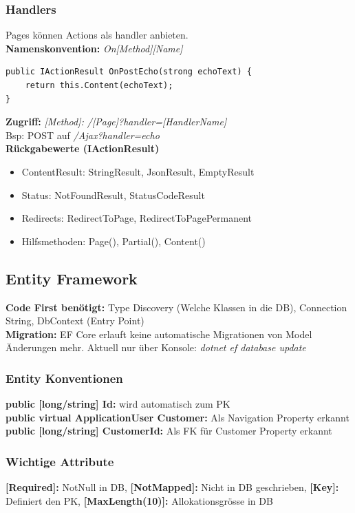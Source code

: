 \subsubsection{Handlers}
Pages können Actions als handler anbieten.\\
\textbf{Namenskonvention:} \textit{On[Method][Name]}
\begin{lstlisting}
public IActionResult OnPostEcho(strong echoText) {
    return this.Content(echoText);
}
\end{lstlisting}
\textbf{Zugriff:} \textit{[Method]: /[Page]?handler=[HandlerName]}\\
Bsp: POST auf \textit{/Ajax?handler=echo}\\
\textbf{Rückgabewerte (IActionResult)}
\begin{itemize}
    \item ContentResult: StringResult, JsonResult, EmptyResult
    \item Status: NotFoundResult, StatusCodeResult
    \item Redirects: RedirectToPage, RedirectToPagePermanent
    \item Hilfsmethoden: Page(), Partial(), Content()
\end{itemize}

\subsection{Entity Framework}
\textbf{Code First benötigt:} Type Discovery (Welche Klassen in die DB), Connection String, DbContext (Entry Point)\\
\textbf{Migration:} EF Core erlauft keine automatische Migrationen von Model Änderungen mehr.
Aktuell nur über Konsole: \textit{dotnet ef database update}
\subsubsection{Entity Konventionen}
\textbf{public [long/string] Id:} wird automatisch zum PK\\
\textbf{public virtual ApplicationUser Customer:} Als Navigation Property erkannt\\
\textbf{public [long/string] CustomerId:} Als FK für Customer Property erkannt\\
\subsubsection{Wichtige Attribute}
\textbf{[Required]:} NotNull in DB,
\textbf{[NotMapped]:} Nicht in DB geschrieben,
\textbf{[Key]:} Definiert den PK,
\textbf{[MaxLength(10)]:} Allokationsgrösse in DB

